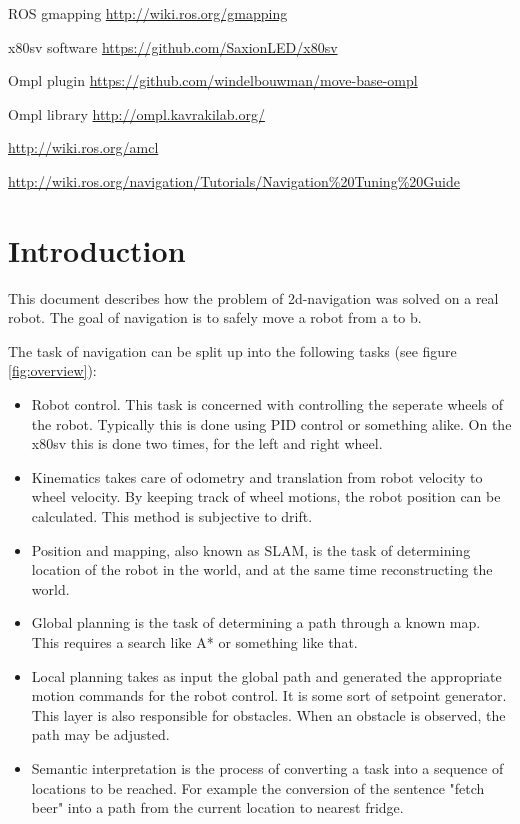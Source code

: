 \documentclass[a4paper]{article}
\begin{document}
\begin{thebibliography}{1}

   ROS gmapping \url{http://wiki.ros.org/gmapping}

   x80sv software \url{https://github.com/SaxionLED/x80sv}

   Ompl plugin
\url{https://github.com/windelbouwman/move-base-ompl}

   Ompl library \url{http://ompl.kavrakilab.org/}

   \url{http://wiki.ros.org/amcl}

   \url{http://wiki.ros.org/navigation/Tutorials/Navigation%20Tuning%20Guide}
\end{thebibliography}

\clearpage

\section{Introduction}

This document describes how the problem of 2d-navigation was solved on a real robot.
The goal of navigation is to safely move a robot from a to b.

The task of navigation can be split up into the following tasks (see figure \ref{fig:overview}):

\begin{itemize}
  \item Robot control. This task is concerned with controlling the seperate wheels of the robot.
  Typically this is done using PID control or something alike. On the x80sv this is done two times, for the left and right wheel.
  \item Kinematics takes care of odometry and translation from robot
  velocity to wheel velocity. By keeping track of wheel motions, the 
  robot position can be
calculated. This method is subjective to drift.
  \item Position and mapping, also known as SLAM, is the task of determining location of the robot in 
  the world, and at the same time reconstructing the world.
  \item Global planning is the task of determining a path through a known map. This requires a search
  like A* or something like that.
  \item Local planning takes as input the global path and generated the appropriate motion commands for
  the robot control. It is some sort of setpoint generator. This layer is also responsible for obstacles.
  When an obstacle is observed, the path may be adjusted.
  \item Semantic interpretation is the process of converting a task into a sequence of locations to be
  reached. For example the conversion of the sentence "fetch beer" into a path from the current location
  to nearest fridge.
\end{itemize}
\end{document}
